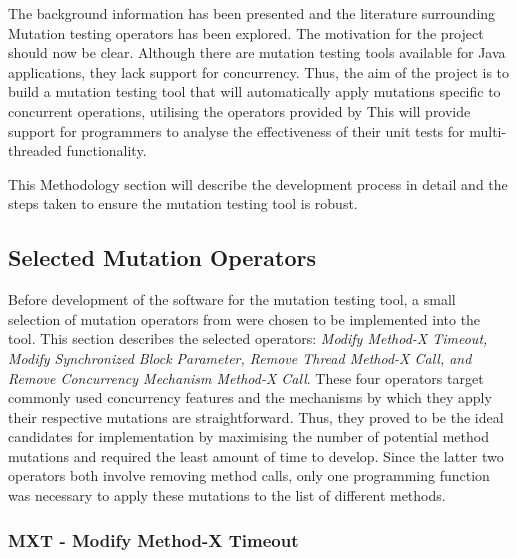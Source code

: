 \documentclass[a4paper,12pt]{article}
\begin{document}
The background information has been presented and the literature surrounding Mutation testing operators has been explored. The motivation for the project should now be clear. Although there are mutation testing tools available for Java applications, they lack support for concurrency. Thus, the aim of the project is to build a mutation testing tool that will automatically apply mutations specific to concurrent operations, utilising the operators provided by \citet{bradbury06} This will provide support for programmers to analyse the effectiveness of their unit tests for multi-threaded functionality.

This Methodology section will describe the development process in detail and the steps taken to ensure the mutation testing tool is robust.   


\subsection{Selected Mutation Operators}

Before development of the software for the mutation testing tool, a small selection of mutation operators from \citet{bradbury06} were chosen to be implemented into the tool. This section describes the selected operators: \textit{Modify Method-X Timeout, Modify Synchronized Block Parameter, Remove Thread Method-X Call, and Remove Concurrency Mechanism Method-X Call}. These four operators target commonly used concurrency features and the mechanisms by which they apply their respective mutations are straightforward. Thus, they proved to be the ideal candidates for implementation by maximising the number of potential method mutations and required the least amount of time to develop. Since the latter two operators both involve removing method calls, only one programming function was necessary to apply these mutations to the list of different methods.    

\subsubsection{MXT - Modify Method-X Timeout}
\end{document}
